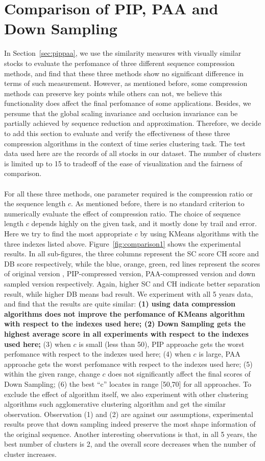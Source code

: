 \section{Comparison of PIP, PAA and Down Sampling}
In Section~\ref{sec:pippaa}, we use the similarity measures with visually similar stocks to evaluate the perfomance of three different sequence compression methods, and find that these three methods show no significant difference in terms of such measurement. However, as mentioned before, some compression methods can preserve key points while others can not, we believe this functionality does affect the final perfomance of some applications. Besides, we persume that the global scaling invariance and occlusion invariance can be partially achieved by sequence reduction and approximation. Therefore, we decide to add this section to evaluate and verify the effectiveness of these three compression algorithms in the context of time series clustering task. The test data used here are the records of all stocks in our dataset. The number of clusters is limited up to 15 to tradeoff of the ease of visualization and the fairness of comparison.\\
\\For all these three methods, one parameter required is the compression ratio or the sequence length $c$. As mentioned before, there is no standard criterion to numerically evaluate the effect of compression ratio. The choice of sequence length $c$ depends highly on the given task, and it mostly done by trail and error. Here we try to find the most appropriate $c$ by using KMeans algorithms with the three indexes listed above. Figure~\ref{fig:comparison1} shows the experimental results. In all sub-figures, the three columns represent the SC score CH score and DB score respectively, while the blue, orange, green, red lines represent the scores of original version , PIP-compressed version, PAA-compressed version and down sampled version respectively. Again, higher SC and CH indicate better separation result, while higher DB means bad result. We experiment with all 5 years data, and find that the results are quite similar: \textbf{(1) using data compression algorithms does not improve the perfomance of KMeans algorithm with respect to the indexes used here; (2) Down Sampling gets the highest average score in all experiments with respect to the indexes used here;} (3) when $c$ is small (less than 50), PIP approache gets the worst perfomance with respect to the indexes used here; (4) when $c$ is large, PAA approache gets the worst perfomance with respect to the indexes used here; (5) within the given range, change $c$ does not significantly affect the final scores of Down Sampling; (6) the best ``c'' locates in range [50,70] for all approaches. To exclude the effect of algorithm itself, we also experiment with other clustering algorithms such agglomerative clustering algorithm and get the similar observation. Observation (1) and (2) are against our assumptions, experimental results prove that down sampling indeed preserve the most shape information of the original sequence. Another interesting observations is that, in all 5 years, the best number of clusters is 2, and the overall score decreases when the number of cluster increases. 
